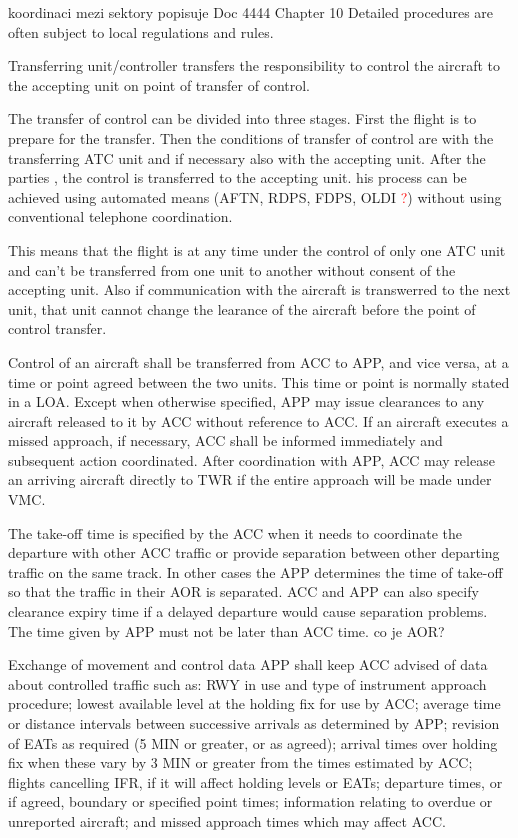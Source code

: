 koordinaci mezi sektory popisuje \cite{doc4444} Doc 4444 Chapter 10
Detailed procedures are often subject to local regulations and rules.

Transferring unit/controller transfers the responsibility to control the aircraft to the accepting unit on point of transfer of control.

The transfer of control can be divided into three stages. First the flight is  to prepare for the transfer. Then the conditions of transfer of control are  with the transferring ATC unit and if necessary also with the accepting unit. After the parties , the control is transferred to the accepting unit. his process can be achieved using automated means (AFTN, RDPS, FDPS, OLDI \textcolor{red}{?}) without using conventional telephone coordination. %
\cite[Chapter 10.1.1]{doc4444}

This means that the flight is at any time under the control of only one ATC unit and can't be transferred from one unit to another without consent of the accepting unit. Also if communication with the aircraft is transwerred to the next unit, that unit cannot change the learance of the aircraft before the point of control transfer.

Control of an aircraft shall be transferred from ACC to APP, and vice versa, at a time or point agreed between the two units. This time or point is normally stated in a LOA.
Except when otherwise specified, APP may issue clearances to any aircraft released to it by ACC without reference to ACC. If an aircraft executes a missed approach, if necessary, ACC shall be informed immediately and subsequent action coordinated. 
After coordination with APP, ACC may release an arriving aircraft directly to TWR if the entire approach will be made under VMC.\cite[Chapter 10.1.3.1]{doc4444}

The take-off time is specified by the ACC when it needs to coordinate the departure with other ACC traffic or provide separation between other departing traffic on the same track. In other cases the APP determines the time of take-off so that the traffic in their AOR is separated. ACC and APP can also specify clearance expiry time if a delayed departure would cause separation problems. The time given by APP must not be later than ACC time. co je AOR?\cite[Chapter 10.1.3.2]{doc4444}

Exchange of movement and control data
APP shall keep ACC advised of data about controlled traffic such as:
RWY in use and type of instrument approach procedure;
lowest available level at the holding fix for use by ACC;
average time or distance intervals between successive arrivals as determined by APP;
revision of EATs as required (5 MIN or greater, or as agreed);
arrival times over holding fix when these vary by 3 MIN or greater from the times estimated by ACC;
flights cancelling IFR, if it will affect holding levels or EATs;
departure times, or if agreed, boundary or specified point times;
information relating to overdue or unreported aircraft; and
missed approach times which may affect ACC.
\cite[Chapter 10.1.3.3]{doc4444}

